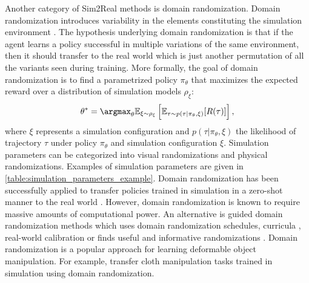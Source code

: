 \documentclass[\home/main.tex]{subfiles}
\begin{document}
Another category of Sim2Real methods is domain randomization. Domain randomization introduces variability in the elements constituting the simulation environment \autocite{tobin2017domain}. The hypothesis underlying domain randomization is that if the agent learns a policy successful in multiple variations of the same environment, then it should transfer to the real world which is just another permutation of all the variants seen during training. More formally, the goal of domain randomization is to find a parametrized policy $\pi_{\theta}$ that maximizes the expected reward over a distribution of simulation models $\rho_{\xi}$:
\begin{equation}
	\theta^{*}=\argmax_{\theta} \mathbb{E}_{\xi \sim \rho_{\xi}}\left[\mathbb{E}_{\tau \sim p(\tau | \pi_{\theta}, \xi)}[R(\tau)]\right],
\end{equation}
where $\xi$ represents a simulation configuration and $p(\tau | \pi_{\theta}, \xi)$ the likelihood of trajectory $\tau$ under policy $\pi_{\theta}$ and simulation configuration $\xi$. Simulation parameters can be categorized into visual randomizations and physical randomizations. Examples of simulation parameters are given in \cref{table:simulation_parameters_example}. 
Domain randomization has been successfully applied to transfer policies trained in simulation in a zero-shot manner to the real world \autocite{tobin2017domain, Peng2018, openai2019solving}. However, domain randomization is known to require massive amounts of computational power. An alternative is guided domain randomization methods which uses domain randomization schedules, curricula \autocite{raparthy2020generating}, real-world calibration \autocite{chebotar2019closing} or finds useful and informative randomizations \autocite{adr2019}. Domain randomization is a popular approach for learning deformable object manipulation. For example, \autocite{Matas2018, wu2020learning} transfer cloth manipulation tasks trained in simulation using domain randomization. 
\end{document}
